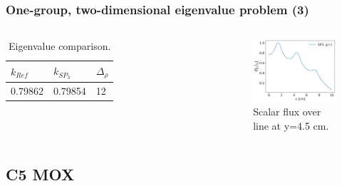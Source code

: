 \begin{frame}
\frametitle{One-group, two-dimensional eigenvalue problem (3)}

\begin{columns}
    \column[t]{5cm}
    \begin{table}[htbp!]
      \centering
      \caption{Eigenvalue comparison.}
      \begin{tabular}{lll}
      \toprule
        $k_{Ref}$ & $k_{SP_3}$  & $\Delta_{\rho}$ \\
      \midrule
        0.79862   & 0.79854     & 12        \\
      \bottomrule
      \end{tabular}
    \end{table}

    \column[t]{5cm}
    \begin{figure}[htbp!]
        \begin{center}
            \includegraphics[width=5cm]{figures/flux-output}
        \end{center}
        \caption{Scalar flux over line at y=4.5 cm.}
    \end{figure}
\end{columns}
\end{frame}


\subsection{C5 MOX}

